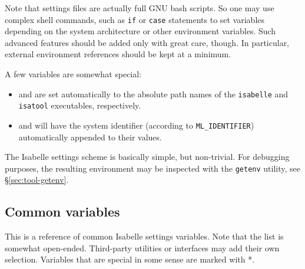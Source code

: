 Note that settings files are actually full GNU bash scripts. So one may use
complex shell commands, such as \texttt{if} or \texttt{case} statements to set
variables depending on the system architecture or other environment variables.
Such advanced features should be added only with great care, though. In
particular, external environment references should be kept at a minimum.

\medskip A few variables are somewhat special:
\begin{itemize}
\item {} and  are set automatically to
  the absolute path names of the \texttt{isabelle} and
  \texttt{isatool} executables, respectively.
  
\item {} and  will have the {\ML}
  system identifier (according to \texttt{ML_IDENTIFIER}) automatically
  appended to their values.
\end{itemize}

\medskip The Isabelle settings scheme is basically simple, but non-trivial.
For debugging purposes, the resulting environment may be inspected with the
\texttt{getenv} utility, see \S\ref{sec:tool-getenv}.


\subsection{Common variables}

This is a reference of common Isabelle settings variables. Note that the list
is somewhat open-ended. Third-party utilities or interfaces may add their own
selection. Variables that are special in some sense are marked with *.

